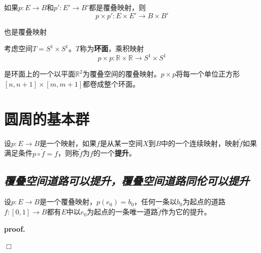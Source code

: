 \begin{mdframed}
    \begin{theorem}
        如果$p:E\rightarrow B$和$p':E'\rightarrow B'$都是覆叠映射，则
        \begin{equation}
            p\times p':E\times E'\rightarrow B\times B'
        \end{equation}

        也是覆叠映射
    \end{theorem}
\end{mdframed}

\vspace*{1em}

考虑空间$T=S^1\times S^1$。$T$称为\textbf{环面}，乘积映射
\begin{equation}
    p\times p:\mathbb{R}\times \mathbb{R}\rightarrow S^1\times S^1
\end{equation}

是环面上的一个以平面$\mathbb{R}^2$为覆叠空间的覆叠映射。$p\times p$将每一个单位正方形$[n,n+1]\times [m,m+1]$都卷成整个环面。

\section{圆周的基本群}


\begin{define}
    设$p:E\rightarrow B$是一个映射，如果$f$是从某一空间$X$到$B$中的一个连续映射，映射$\tilde{f}$如果满足条件$p\circ \tilde{f}=f$，则称$\tilde{f}$为$f$的一个\textbf{提升}。 
\end{define}

\vspace*{1em}

\subsection*{\textsl{覆叠空间道路可以提升，覆叠空间道路同伦可以提升}}

\begin{mdframed}
    \begin{lemma}
        设$p:E\rightarrow B$是一个覆叠映射，$p(e_0)=b_0$，任何一条以$b_0$为起点的道路$f:[0,1]\rightarrow B$都有$E$中以$e_0$为起点的一条唯一道路$\tilde{f}$作为它的提升。
    \end{lemma}
\end{mdframed}

\textbf{proof. }

$\Box$

\vspace*{5em}

